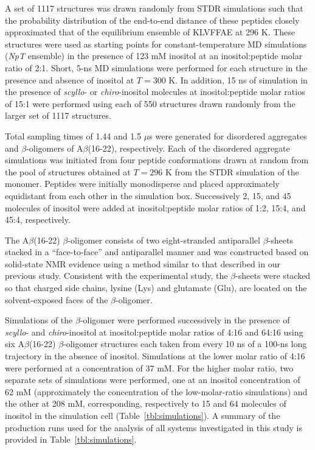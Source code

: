 A set of 1117 structures was drawn randomly from STDR simulations such that the probability distribution of the end-to-end distance of these peptides closely approximated that of the equilibrium ensemble of KLVFFAE at 296 K. These structures were used as starting points for constant-temperature MD simulations (\emph{NpT} ensemble) in the presence of 123 mM inositol at an inositol:peptide molar ratio of 2:1. Short, 5-ns MD simulations were performed for each structure in the presence and absence of inositol at $T=300$ K. In addition, 15 ns of simulation in the presence of \emph{scyllo}- or \emph{chiro}-inositol molecules at inositol:peptide molar ratios of 15:1 were performed using each of 550 structures drawn randomly from the larger set of 1117 structures.

Total sampling times of 1.44 and 1.5 $\mu$s were generated for disordered aggregates and $\beta$-oligomers of A$\beta$(16-22), respectively. Each of the disordered aggregate simulations was initiated from four peptide conformations drawn at random from the pool of structures obtained at $T=296$ K from the STDR simulation of the monomer. Peptides were initially monodisperse and placed approximately equidistant from each other in the simulation box. Successively 2, 15, and 45 molecules of inositol were added at inositol:peptide molar ratios of 1:2, 15:4, and 45:4, respectively.

The A$\beta$(16-22) $\beta$-oligomer consists of two eight-stranded antiparallel $\beta$-sheets stacked in a ``face-to-face'' and antiparallel manner and was constructed based on solid-state NMR evidence\cite{Balbach:2000p49} using a method similar to that described in our previous study.\cite{Li:2012p853} Consistent with the experimental study, the $\beta$-sheets were stacked so that charged side chains, lysine (Lys) and glutamate (Glu), are located on the solvent-exposed faces of the $\beta$-oligomer.

Simulations of the $\beta$-oligomer were performed successively in the presence of  \emph{scyllo}- and  \emph{chiro}-inositol at inositol:peptide molar ratios of 4:16 and 64:16  using six A$\beta$(16-22) $\beta$-oligomer structures each taken from every 10 ns of a 100-ns long trajectory in the absence of inositol. Simulations at the lower molar ratio of 4:16 were performed at a concentration of 37 mM. For the higher molar ratio, two separate sets of simulations were performed, one at an inositol concentration of 62 mM (approximately the concentration of the low-molar-ratio simulations) and the other at 208 mM, corresponding, respectively to 15 and 64 molecules of inositol in the simulation cell (Table~\ref{tbl:simulations}).  A summary of the production runs used for the analysis of all systems investigated in this study is provided in Table~\ref{tbl:simulations}.


